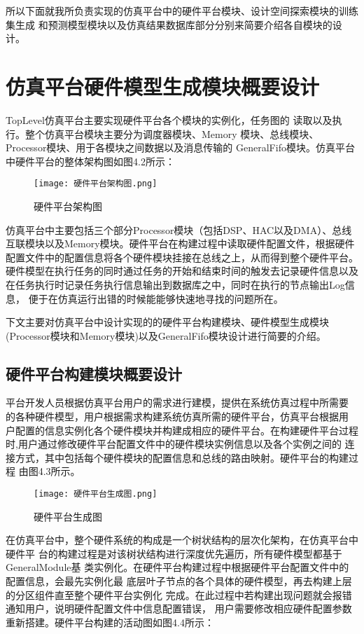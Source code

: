 所以下面就我所负责实现的仿真平台中的硬件平台模块、设计空间探索模块的训练集生成
和预测模型模块以及仿真结果数据库部分分别来简要介绍各自模块的设计。

\section{仿真平台硬件模型生成模块概要设计}
TopLevel仿真平台主要实现硬件平台各个模块的实例化，任务图的
读取以及执行。整个仿真平台模块主要分为调度器模块、Memory
模块、总线模块、Processor模块、用于各模块之间数据以及消息传输的
GeneralFifo模块。仿真平台中硬件平台的整体架构图如图4.2所示：

\begin{figure}[h]
    \centering
    \texttt{[image: 硬件平台架构图.png]}
    \caption{硬件平台架构图}
    \label{fig:badge}
\end{figure}

仿真平台中主要包括三个部分Processor模块（包括DSP、HAC以及DMA）、总线
互联模块以及Memory模块。硬件平台在构建过程中读取硬件配置文件，根据硬件
配置文件中的配置信息将各个硬件模块挂接在总线之上，从而得到整个硬件平台。
硬件模型在执行任务的同时通过任务的开始和结束时间的触发去记录硬件信息以及
在任务执行时记录任务执行信息输出到数据库之中，同时在执行的节点输出Log信息，
便于在仿真运行出错的时候能能够快速地寻找的问题所在。

下文主要对仿真平台中设计实现的的硬件平台构建模块、硬件模型生成模块
(Processor模块和Memory模块)以及GeneralFifo模块设计进行简要的介绍。

\subsection{硬件平台构建模块概要设计}
平台开发人员根据仿真平台用户的需求进行建模，提供在系统仿真过程中所需要
的各种硬件模型，用户根据需求构建系统仿真所需的硬件平台，仿真平台根据用
户配置的信息实例化各个硬件模块并构建成相应的硬件平台。在构建硬件平台过程
时,用户通过修改硬件平台配置文件中的硬件模块实例信息以及各个实例之间的
连接方式，其中包括每个硬件模块的配置信息和总线的路由映射。硬件平台的构建过程
由图4.3所示。

\begin{figure}[h]
    \centering
    \texttt{[image: 硬件平台生成图.png]}
    \caption{硬件平台生成图}
    \label{fig:badge}
\end{figure}

在仿真平台中，整个硬件系统的构成是一个树状结构的层次化架构，在仿真平台中硬件平
台的构建过程是对该树状结构进行深度优先遍历，所有硬件模型都基于GeneralModule基
类实例化。在硬件平台构建过程中根据硬件平台配置文件中的配置信息，会最先实例化最
底层叶子节点的各个具体的硬件模型，再去构建上层的分区组件直至整个硬件平台实例化
完成。在此过程中若构建出现问题就会报错通知用户，说明硬件配置文件中信息配置错误，
用户需要修改相应硬件配置参数重新搭建。硬件平台构建的活动图如图4.4所示：

